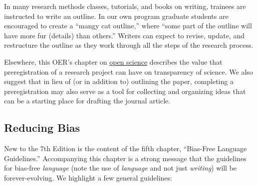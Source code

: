 \documentclass[
  11pt,
]{book}
\begin{document}
In many research methods classes, tutorials, and books on writing, trainees are instructed to write an outline. In our own program graduate students are encouraged to create a ``mangy cat outline,'' where ``some part of the outline will have more fur (details) than others.'' Writers can expect to revise, update, and restructure the outline as they work through all the steps of the research process.

Elsewhere, this OER's chapter on \hyperref[OpSci]{open science} describes the value that preregistration of a research project can have on transparency of science. We also suggest that in lieu of (or in addition to) outlining the paper, completing a preregistration may also serve as a tool for collecting and organizing ideas that can be a starting place for drafting the journal article.

\subsection{Reducing Bias}\label{reducing-bias}

New to the 7th Edition is the content of the fifth chapter, ``Bias-Free Language Guidelines.'' Accompanying this chapter is a strong message that the guidelines for bias-free \emph{language} (note the use of \emph{language} and not just \emph{writing}) will be forever-evolving. We highlight a few general guidelines:
\end{document}
